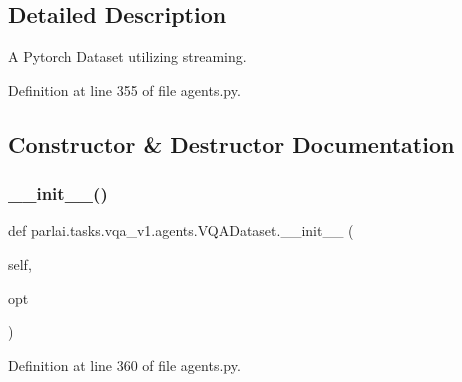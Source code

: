 \subsection{Detailed Description}
\begin{DoxyVerb}A Pytorch Dataset utilizing streaming.
\end{DoxyVerb}
 

Definition at line 355 of file agents.\+py.



\subsection{Constructor \& Destructor Documentation}
\mbox{\label{classparlai_1_1tasks_1_1vqa__v1_1_1agents_1_1VQADataset_a0d660907fd4d3bb3644c139308223ec0}} 
\subsubsection{\texorpdfstring{\+\_\+\+\_\+init\+\_\+\+\_\+()}{\_\_init\_\_()}}
{\footnotesize\ttfamily def parlai.\+tasks.\+vqa\+\_\+v1.\+agents.\+V\+Q\+A\+Dataset.\+\_\+\+\_\+init\+\_\+\+\_\+ (\begin{DoxyParamCaption}\item[{}]{self,  }\item[{}]{opt }\end{DoxyParamCaption})}



Definition at line 360 of file agents.\+py.



